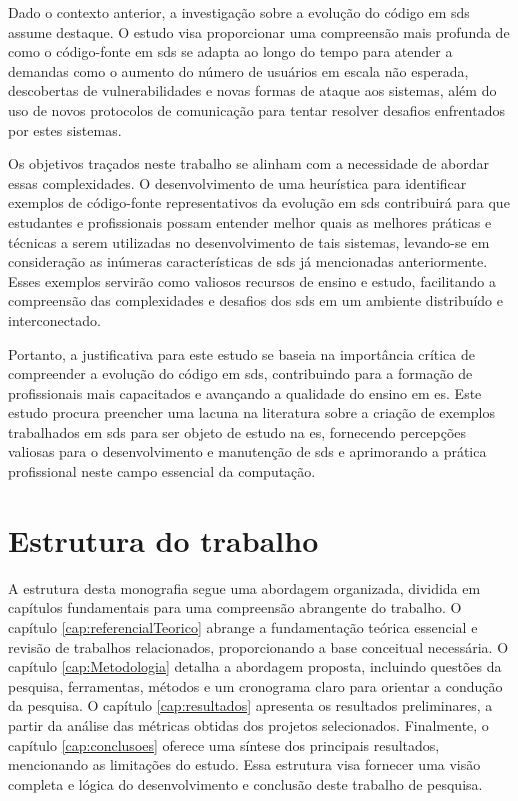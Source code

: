 Dado o contexto anterior, a investigação sobre a evolução do código em \gls{sds} assume destaque. O estudo visa proporcionar uma compreensão mais profunda de como o código-fonte em \gls{sds} se adapta ao longo do tempo para atender a demandas como o aumento do número de usuários em escala não esperada, descobertas de vulnerabilidades e novas formas de ataque aos sistemas, além do uso de novos protocolos de comunicação para tentar resolver desafios enfrentados por estes sistemas.

Os objetivos traçados neste trabalho se alinham com a necessidade de abordar essas complexidades. O desenvolvimento de uma heurística para identificar exemplos de código-fonte representativos da evolução em \gls{sds} contribuirá para que estudantes e profissionais possam entender melhor quais as melhores práticas e técnicas a serem utilizadas no desenvolvimento de tais sistemas, levando-se em consideração as inúmeras características de \gls{sds} já mencionadas anteriormente. Esses exemplos servirão como valiosos recursos de ensino e estudo, facilitando a compreensão das complexidades e desafios dos \gls{sds} em um ambiente distribuído e interconectado.

Portanto, a justificativa para este estudo se baseia na importância crítica de compreender a evolução do código em \gls{sds}, contribuindo para a formação de profissionais mais capacitados e avançando a qualidade do ensino em \gls{es}. Este estudo procura preencher uma lacuna na literatura sobre a criação de exemplos trabalhados em \gls{sds} para ser objeto de estudo na \gls{es}, fornecendo percepções valiosas para o desenvolvimento e manutenção de \gls{sds} e aprimorando a prática profissional neste campo essencial da computação.

\section{Estrutura do trabalho}
\label{sec:estruturaTrabalho}

A estrutura desta monografia segue uma abordagem organizada, dividida em capítulos fundamentais para uma compreensão abrangente do trabalho. O capítulo \ref{cap:referencialTeorico} abrange a fundamentação teórica essencial e revisão de trabalhos relacionados, proporcionando a base conceitual necessária. O capítulo  \ref{cap:Metodologia} detalha a abordagem proposta, incluindo questões da pesquisa, ferramentas, métodos e um cronograma claro para orientar a condução da pesquisa. O capítulo \ref{cap:resultados} apresenta os resultados preliminares, a partir da análise das métricas obtidas dos projetos selecionados. Finalmente, o capítulo \ref{cap:conclusoes} oferece uma síntese dos principais resultados, mencionando as limitações do estudo. Essa estrutura visa fornecer uma visão completa e lógica do desenvolvimento e conclusão deste trabalho de pesquisa.
